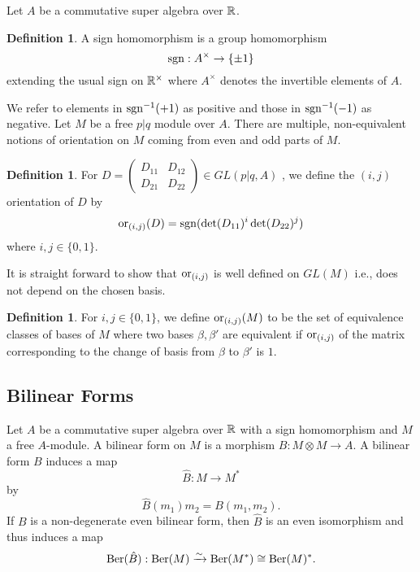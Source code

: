 \documentclass[11pt]{amsart}
\numberwithin{equation}{section}
\numberwithin{figure}{section}
\theoremstyle{plain}
\theoremstyle{definition}
\newtheorem{defn}[thm]{Definition}
\theoremstyle{remark}
\begin{document}
Let $A$ be a commutative super algebra over $\mathbb{R}$.
\begin{defn}
A sign homomorphism is a group homomorphism 
\[
\mathrm{sgn}:A^{\times}\rightarrow\{\pm1\}
\]
extending the usual sign on $\mathbb{R}^{\times}$ where $A^{\times}$ denotes
the invertible elements of $A$. 
\end{defn}
We refer to elements in $\mathrm{sgn}^{-1}(+1)$ as positive and those in
$\mathrm{sgn}^{-1}(-1)$ as negative. Let $M$ be a free $p|q$ module over
$A$. There are multiple, non-equivalent notions of orientation on
$M$ coming from even and odd parts of $M$.
\begin{defn}
For $D=\left(\begin{matrix}D_{11} & D_{12}\\
D_{21} & D_{22}
\end{matrix}\right)\in GL(p|q,A)$ , we define the $(i,j)$ orientation of $D$ by 
\[
\mathrm{or}{}_{(i,j)}(D)=\mathrm{sgn}(\det(D_{11})^{i}\det(D_{22})^{j})
\]
where $i,j\in\{0,1\}$.
\end{defn}
It is straight forward to show that $\mathrm{or}{}_{(i,j)}$ is well defined
on $GL(M)$ i.e., does not depend on the chosen basis.
\begin{defn}
For $i,j\in\{0,1\}$, we define $\mathrm{or}_{(i,j)}(M)$ to be the set of
equivalence classes of bases of $M$ where two bases $\beta,\beta'$
are equivalent if $\mathrm{or}_{(i,j)}$ of the matrix corresponding to the
change of basis from $\beta$ to $\beta'$ is $1$. 
\end{defn}

\subsection{Bilinear Forms\label{sub:Bilinear-Forms}}

Let $A$ be a commutative super algebra over $\mathbb{R}$ with a sign homomorphism
and $M$ a free $A$-module. A bilinear form on $M$ is a morphism
$B:M\otimes M\rightarrow A$. A bilinear form $B$ induces a map 
\[
\hat{B}:M\rightarrow M^{*}
\]
by 
\[
\hat{B}(m_{1})m_{2}=B(m_{1},m_{2}).
\]
If $B$ is a non-degenerate even bilinear form, then $\hat{B}$ is
an even isomorphism and thus induces a map
\[
\mathrm{Ber}(\hat{B}):\mathrm{Ber}(M)\xrightarrow{\sim}\mathrm{Ber}(M^{*})\cong\mathrm{Ber}(M)^{*}.
\]
\end{document}
